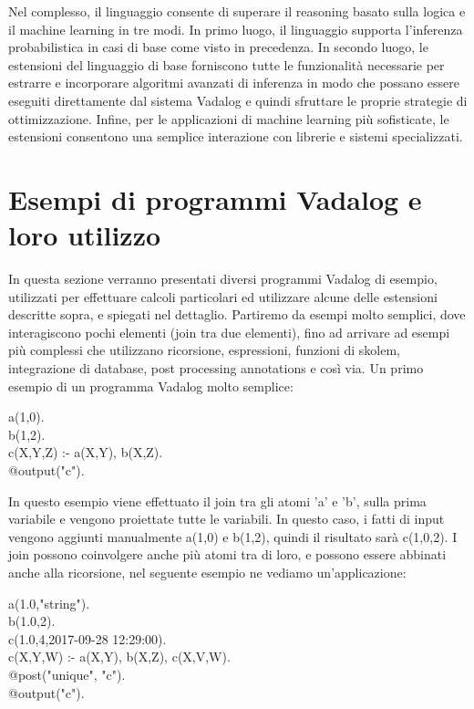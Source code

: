 Nel complesso, il linguaggio consente di superare il reasoning basato sulla logica e il machine learning in tre modi. In primo luogo, il linguaggio supporta l'inferenza probabilistica in casi di base come visto in precedenza. \newline
In secondo luogo, le estensioni del linguaggio di base forniscono tutte le funzionalità necessarie per estrarre e incorporare algoritmi avanzati di inferenza in modo che possano essere eseguiti direttamente dal sistema Vadalog e quindi sfruttare le proprie strategie di ottimizzazione. \newline
Infine, per le applicazioni di machine learning più sofisticate, le estensioni consentono una semplice interazione con librerie e sistemi specializzati.

\section{Esempi di programmi Vadalog e loro utilizzo}

In questa sezione verranno presentati diversi programmi Vadalog di esempio, utilizzati per effettuare calcoli particolari ed utilizzare alcune delle estensioni descritte sopra, e spiegati nel dettaglio. \newline
Partiremo da esempi molto semplici, dove interagiscono pochi elementi (join tra due elementi), fino ad arrivare ad esempi più complessi che utilizzano ricorsione, espressioni, funzioni di skolem, integrazione di database, post processing annotations e così via. \newline
Un primo esempio di un programma Vadalog molto semplice:

\begin{algorithm}[h]
	a(1,0). \\
	b(1,2). \\
	c(X,Y,Z) :- a(X,Y), b(X,Z). \\
	@output("c").
\end{algorithm}

In questo esempio viene effettuato il join tra gli atomi 'a' e 'b', sulla prima variabile e vengono proiettate tutte le variabili. In questo caso, i fatti di input vengono aggiunti manualmente a(1,0) e b(1,2), quindi il risultato sarà c(1,0,2). \newline
I join possono coinvolgere anche più atomi tra di loro, e possono essere abbinati anche alla ricorsione, nel seguente esempio ne vediamo un'applicazione: 

\begin{algorithm}[h]
	a(1.0,"string"). \\
	b(1.0,2). \\
	c(1.0,4,2017-09-28 12:29:00). \\
	c(X,Y,W) :- a(X,Y), b(X,Z), c(X,V,W). \\
	@post("unique", "c"). \\
	@output("c").
\end{algorithm}

